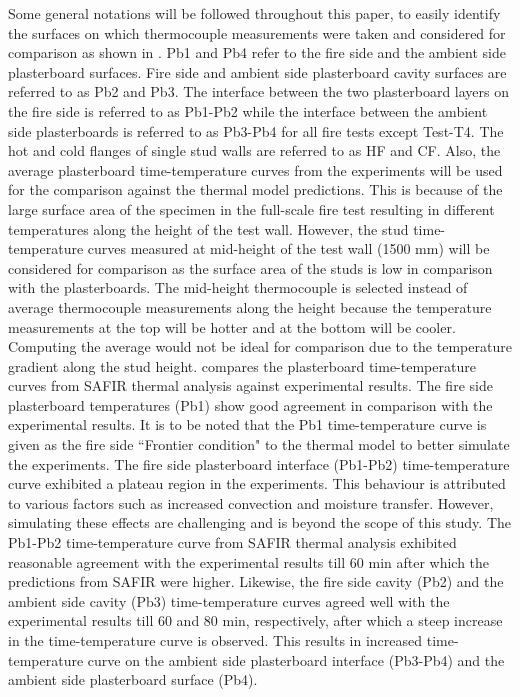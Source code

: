 Some general notations will be followed throughout this paper, to easily identify the surfaces on which thermocouple measurements were taken and considered for comparison as shown in . Pb1 and Pb4 refer to the fire side and the ambient side plasterboard surfaces. Fire side and ambient side plasterboard cavity surfaces are referred to as Pb2 and Pb3. The interface between the two plasterboard layers on the fire side is referred to as Pb1-Pb2 while the interface between the ambient side plasterboards is referred to as Pb3-Pb4 for all fire tests except Test-T4. The hot and cold flanges of single stud walls are referred to as HF and CF. Also, the average plasterboard time-temperature curves from the experiments will be used for the comparison against the thermal model predictions. This is because of the large surface area of the specimen in the full-scale fire test resulting in different temperatures along the height of the test wall. However, the stud time-temperature curves measured at mid-height of the test wall (1500 mm) will be considered for comparison as the surface area of the studs is low in comparison with the plasterboards. The mid-height thermocouple is selected instead of average thermocouple measurements along the height because the temperature measurements at the top will be hotter and at the bottom will be cooler. Computing the average would not be ideal for comparison due to the temperature gradient along the stud height.  compares the plasterboard time-temperature curves from SAFIR thermal analysis against experimental results. The fire side plasterboard temperatures (Pb1) show good agreement in comparison with the experimental results. It is to be noted that the Pb1 time-temperature curve is given as the fire side ``Frontier condition" to the thermal model to better simulate the experiments. The fire side plasterboard interface (Pb1-Pb2) time-temperature curve exhibited a plateau region in the experiments. This behaviour is attributed to various factors such as increased convection and moisture transfer. However, simulating these effects are challenging and is beyond the scope of this study. The Pb1-Pb2 time-temperature curve from SAFIR thermal analysis exhibited reasonable agreement with the experimental results till 60 min after which the predictions from SAFIR were higher. Likewise, the fire side cavity (Pb2) and the ambient side cavity (Pb3) time-temperature curves agreed well with the experimental results till 60 and 80 min, respectively, after which a steep increase in the time-temperature curve is observed. This results in increased time-temperature curve on the ambient side plasterboard interface (Pb3-Pb4) and the ambient side plasterboard surface (Pb4). 
